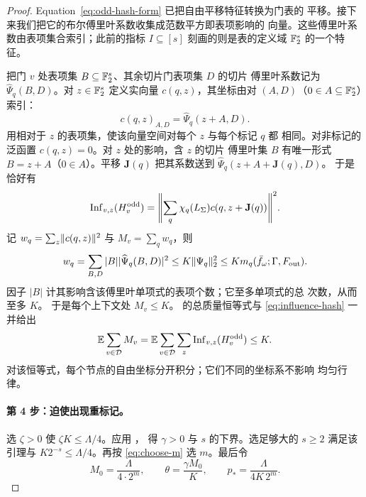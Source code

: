\begin{proof}
Equation~\eqref{eq:odd-hash-form} 已把自由平移特征转换为门表的
平移。接下来我们把它的布尔傅里叶系数收集成范数平方即表项影响的
向量。这些傅里叶系数由表项集合索引；此前的指标 $I\subseteq[s]$
刻画的则是表的定义域 $\mathbb F_2^s$ 的一个特征。

把门 $v$ 处表项集 $B\subseteq\mathbb F_2^s$、其余切片门表项集 $D$ 的切片
傅里叶系数记为 $\widehat\Psi_q(B,D)$。对 $z\in\mathbb F_2^s$ 定义实向量
$c(q,z)$，其坐标由对 $(A,D)$（$0\in A\subseteq\mathbb F_2^s$）索引：
\[
 c(q,z)_{A,D}=\widehat\Psi_q(z+A,D).
\]
用相对于 $z$ 的表项集，使该向量空间对每个 $z$ 与每个标记 $q$ 都
相同。对非标记的泛函置 $c(q,z)=0$。对 $z$ 处的影响，含 $z$ 的切片
傅里叶集 $B$ 有唯一形式 $B=z+A$（$0\in A$）。平移
$\mathbf J(q)$ 把其系数送到 $\widehat\Psi_q(z+A+\mathbf J(q),D)$。
于是恰好有
\begin{equation}\label{eq:influence-hash}
 \Inf_{v,z}(H_v^{\mathrm{odd}})
 =\norm*{\sum_q\chi_q(L_\Sigma)c(q,z+\mathbf J(q))}^2.
\end{equation}
记 $w_q=\sum_z\lVert c(q,z)\rVert^2$ 与 $M_v=\sum_qw_q$，则
\begin{equation}\label{eq:wq-mq}
 w_q=\sum_{B,D}|B|\lvert\widehat\Psi_q(B,D)\rvert^2
 \le K\lVert\Psi_q\rVert_2^2
 \le K m_q(\bar f_\omega;\Gamma,F_{\mathrm{out}}).
\end{equation}
因子 $|B|$ 计其影响含该傅里叶单项式的表项个数；它至多单项式的总
次数，从而至多 $K$。
于是每个上下文处 $M_v\le K$。 的总质量恒等式与
\eqref{eq:influence-hash} 一并给出
\begin{equation}\label{eq:sum-M}
 \mathbb E\sum_{v\in\mathcal D}M_v
 =\mathbb E\sum_{v\in\mathcal D}\sum_z
     \operatorname{Inf}_{v,z}(H_v^{\mathrm{odd}})\le K.
\end{equation}
对该恒等式，每个节点的自由坐标分开积分；它们不同的坐标系不影响
均匀行律。

\paragraph{第 4 步：迫使出现重标记。}
选 $\zeta>0$ 使 $\zeta K\le\Lambda/4$。应用 ，
得 $\gamma>0$ 与 $s$ 的下界。选足够大的 $s\ge2$ 满足该引理与
$K2^{-s}\le\Lambda/4$。再按 \eqref{eq:choose-m} 选 $m$。最后令
\begin{equation}\label{eq:extraction-constants}
 M_0=\frac{\Lambda}{4\cdot2^m},\qquad
 \theta=\frac{\gamma M_0}{K},\qquad
 p_* =\frac{\Lambda}{4K\,2^m}.
\end{equation}


\end{proof}
